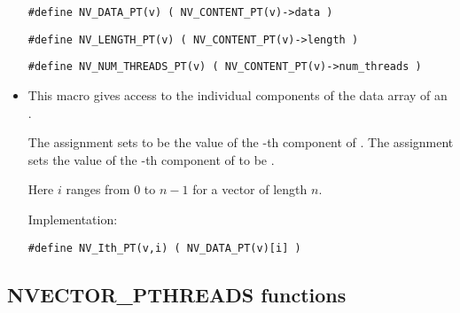 \begin{itemize}
  \verb|#define NV_DATA_PT(v) ( NV_CONTENT_PT(v)->data )|
  
  \verb|#define NV_LENGTH_PT(v) ( NV_CONTENT_PT(v)->length )|

  \verb|#define NV_NUM_THREADS_PT(v) ( NV_CONTENT_PT(v)->num_threads )|

\item {}                                               
                                                            
  This macro gives access to the individual components of the data
  array of an .

  The assignment  sets  to be the value of 
  the -th component of . The assignment    
  sets the value of the -th component of  to be .        
  
  Here $i$ ranges from $0$ to $n-1$ for a vector of length $n$.

  Implementation:

  \verb|#define NV_Ith_PT(v,i) ( NV_DATA_PT(v)[i] )|

\end{itemize}

\subsection{NVECTOR\_PTHREADS functions}
\label{ss:nvec_pthreads_functions}

